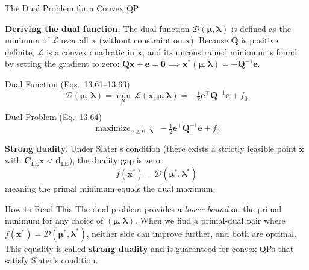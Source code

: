 \documentclass[aspectratio=169,10pt]{beamer}
\DeclareMathOperator*{\maximize}{maximize}
\newcommand{\bx}{\mathbf{x}}
\newcommand{\bC}{\mathbf{C}}
\newcommand{\bd}{\mathbf{d}}
\newcommand{\bQ}{\mathbf{Q}}
\newcommand{\bmu}{\boldsymbol{\mu}}
\newcommand{\blambda}{\boldsymbol{\lambda}}
\begin{document}
\begin{frame}[allowframebreaks]{The Dual Problem for a Convex QP}
  \framebreak

  \textbf{Deriving the dual function.}  The dual function $\mathcal{D}(\bmu, \blambda)$
  is defined as the minimum of $\mathcal{L}$ over all $\bx$ (without constraint on $\bx$).
  Because $\bQ$ is positive definite, $\mathcal{L}$ is a convex quadratic in $\bx$,
  and its unconstrained minimum is found by setting the gradient to zero:
  $\bQ\bx + \mathbf{e} = \mathbf{0} \implies \bx^*(\bmu,\blambda) = -\bQ^{-1}\mathbf{e}$.

  \begin{block}{Dual Function (Eqs.~13.61--13.63)}
    \[
      \mathcal{D}(\bmu,\, \blambda)
      = \min_{\bx}\, \mathcal{L}(\bx,\bmu,\blambda)
      = -\tfrac{1}{2}\mathbf{e}^{\top}\bQ^{-1}\mathbf{e} + f_0
    \]
  \end{block}

  \begin{block}{Dual Problem (Eq.~13.64)}
    \[
      \maximize_{\bmu \geq \mathbf{0},\;\blambda}\;
      -\tfrac{1}{2}\mathbf{e}^{\top}\bQ^{-1}\mathbf{e} + f_0
    \]
  \end{block}

  \textbf{Strong duality.}  Under Slater's condition (there exists a strictly feasible
  point $\bx$ with $\bC_{\text{LE}}\bx < \bd_{\text{LE}}$), the duality gap is zero:
  \[
    f(\bx^*) = \mathcal{D}(\bmu^*, \blambda^*)
  \]
  meaning the primal minimum equals the dual maximum.

  \begin{alertblock}{How to Read This}
    The dual problem provides a \emph{lower bound} on the primal minimum for
    any choice of $(\bmu, \blambda)$.  When we find a primal-dual pair where
    $f(\bx^*) = \mathcal{D}(\bmu^*, \blambda^*)$, neither side can improve further,
    and both are optimal.  This equality is called \textbf{strong duality} and is
    guaranteed for convex QPs that satisfy Slater's condition.
  \end{alertblock}

\end{frame}
\end{document}
